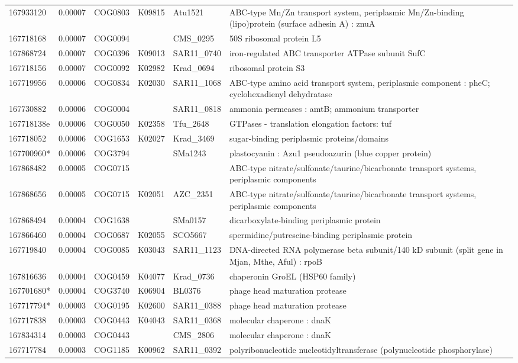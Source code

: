 \begin{landscape}
\begin{longtable}{p{1.6cm}p{1.2cm}p{1.5cm}p{1.5cm}p{2.8cm}p{13.5cm}}
167933120&0.00007&COG0803&K09815&Atu1521&ABC-type Mn/Zn transport system, periplasmic Mn/Zn-binding (lipo)protein (surface adhesin A) : znuA \\
167718168&0.00007&COG0094&&CMS\_0295&50S ribosomal protein L5 \\
167868724&0.00007&COG0396&K09013&SAR11\_0740&iron-regulated ABC transporter ATPase subunit SufC \\
167718156&0.00007&COG0092&K02982&Krad\_0694&ribosomal protein S3 \\
167719956&0.00006&COG0834&K02030&SAR11\_1068&ABC-type amino acid transport system, periplasmic component : pheC; cyclohexadienyl dehydratase \\
167730882&0.00006&COG0004&&SAR11\_0818&ammonia permeases : amtB; ammonium transporter \\
167718138e&0.00006&COG0050&K02358&Tfu\_2648&GTPases - translation elongation factors: tuf \\
167718052&0.00006&COG1653&K02027&Krad\_3469&sugar-binding periplasmic proteins/domains \\
167700960*&0.00006&COG3794&&SMa1243&plastocyanin :  Azu1 pseudoazurin (blue copper protein) \\
167868482&0.00005&COG0715&&&ABC-type nitrate/sulfonate/taurine/bicarbonate transport systems, periplasmic components \\
167868656&0.00005&COG0715&K02051&AZC\_2351&ABC-type nitrate/sulfonate/taurine/bicarbonate transport systems, periplasmic components \\
167868494&0.00004&COG1638&&SMa0157&dicarboxylate-binding periplasmic protein \\
167866460&0.00004&COG0687&K02055&SCO5667&spermidine/putrescine-binding periplasmic protein \\
167719840&0.00004&COG0085&K03043&SAR11\_1123&DNA-directed RNA polymerase beta subunit/140 kD subunit (split gene in Mjan, Mthe, Aful) : rpoB \\
167816636&0.00004&COG0459&K04077&Krad\_0736&chaperonin GroEL (HSP60 family) \\
167701680*&0.00004&COG3740&K06904&BL0376&phage head maturation protease \\
167717794*&0.00003&COG0195&K02600&SAR11\_0388&phage head maturation protease \\
167717838&0.00003&COG0443&K04043&SAR11\_0368&molecular chaperone : dnaK \\
167834314&0.00003&COG0443&&CMS\_2806&molecular chaperone : dnaK \\
167717784&0.00003&COG1185&K00962&SAR11\_0392&polyribonucleotide nucleotidyltransferase (polynucleotide phosphorylase) \\

\end{longtable}
\end{landscape}
